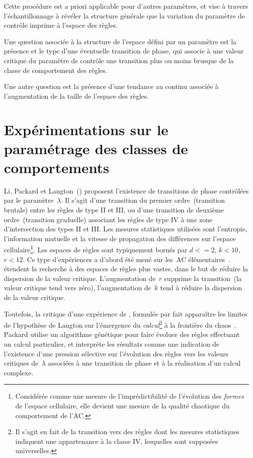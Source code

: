 Cette procédure est a priori applicable pour d'autres paramètres, %
et vise à travers l'échantillonnage à révéler la structure générale
que la variation du paramètre de contrôle imprime à l'espace des règles. %

Une question associée à la structure de l'espace défini par un
paramètre est la présence et le type d'une éventuelle transition de
phase, qui associe à une valeur critique du paramètre de contrôle une
transition plus ou moins brusque de la classe de comportement des
règles. %

Une autre question est la présence d'une tendance au continu associée
à l'augmentation de la taille de l'espace des règles. %

\section[paramétrage des classes de comportements]%
{Expérimentations sur le paramétrage des classes de comportements}

Li, Packard et Langton~(\citeyear{Li90b}) proposent l'existence de
transitions de phase contrôlées par le paramètre~$\lambda$. %
Il s'agit d'une transition du premier ordre~(transition brutale) entre
les règles de type II et III, %
ou d'une transition de deuxième ordre~(transition graduelle) associant
les règles de type IV à une zone d'intersection des types II et III\@. %
Les mesures statistiques utilisées sont l'entropie, l'information
mutuelle et la vitesse de propagation des différences sur l'espace
cellulaire\footnote{%
  Considérée comme une mesure de l'imprédictibilité de l'évolution
  des \emph{formes} de l'espace cellulaire, elle devient une mesure
  de la qualité chaotique du comportement de l'AC.}. %
Les espaces de règles sont typiquement bornés par $d <= 2$, $k < 10$,
$r < 12$. %
Ce type d'expériences a d'abord été mené sur les~AC
élémentaires~\cite[]{Li90a}. %
\cite{Wootters90} étendent la recherche à des
espaces de règles plus vastes, dans le but de réduire la dispersion de
la valeur critique. %
L'augmentation de~$r$ supprime la transition~(la valeur critique tend
vers zéro), l'augmentation de~$k$ tend à réduire la dispersion de la
valeur critique.

Toutefois, la critique d'une expérience de \cite{Packard88},
formulée par \cite{Mitchell93a} fait apparaître les limites
de l'hypothèse de Langton sur l'émergence du \emph{calcul}\footnote{%
  Il s'agit en fait de la transition vers des règles dont les mesures
  statistiques indiquent une appartenance à la classe IV, lesquelles
  sont supposées universelles.} %
à la frontière du chaos~\cite[]{Langton90,Langton92b}. %
Packard utilise un algorithme génétique pour faire évoluer des règles
effectuant un calcul particulier, et interprète les résultats comme
une indication de l'existence d'une pression sélective sur l'évolution
des règles vers les valeurs critiques de~$\lambda$ associées à une
transition de phase et à la réalisation d'un calcul complexe.

